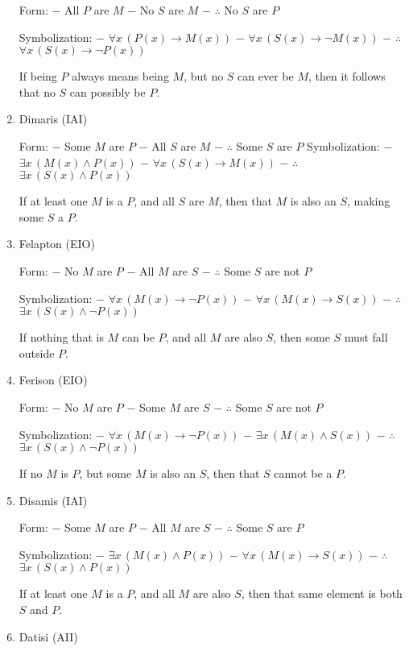 \begin{enumerate}
  Form: − All \(P\) are \(M\) − No \(S\) are \(M\) − \(\therefore\) No
  \(S\) are \(P\)

  Symbolization: − \(\forall x \, (P(x) \rightarrow M(x))\) −
  \(\forall x \, (S(x) \rightarrow \lnot M(x))\) − \(\therefore\)
  \(\forall x \, (S(x) \rightarrow \lnot P(x))\)

  If being \(P\) always means being \(M\), but no \(S\) can ever be
  \(M\), then it follows that no \(S\) can possibly be \(P\).
\item
  Dimaris (IAI)

  Form: − Some \(M\) are \(P\) − All \(S\) are \(M\) − \(\therefore\)
  Some \(S\) are \(P\) Symbolization: −
  \(\exists x \, (M(x) \land P(x))\) −
  \(\forall x \, (S(x) \rightarrow M(x))\) − \(\therefore\)
  \(\exists x \, (S(x) \land P(x))\)

  If at least one \(M\) is a \(P\), and all \(S\) are \(M\), then that
  \(M\) is also an \(S\), making some \(S\) a \(P\).
\item
  Felapton (EIO)

  Form: − No \(M\) are \(P\) − All \(M\) are \(S\) − \(\therefore\) Some
  \(S\) are not \(P\)

  Symbolization: − \(\forall x \, (M(x) \rightarrow \lnot P(x))\) −
  \(\forall x \, (M(x) \rightarrow S(x))\) − \(\therefore\)
  \(\exists x \, (S(x) \land \lnot P(x))\)

  If nothing that is \(M\) can be \(P\), and all \(M\) are also \(S\),
  then some \(S\) must fall outside \(P\).
\item
  Ferison (EIO)

  Form: − No \(M\) are \(P\) − Some \(M\) are \(S\) − \(\therefore\)
  Some \(S\) are not \(P\)

  Symbolization: − \(\forall x \, (M(x) \rightarrow \lnot P(x))\) −
  \(\exists x \, (M(x) \land S(x))\) − \(\therefore\)
  \(\exists x \, (S(x) \land \lnot P(x))\)

  If no \(M\) is \(P\), but some \(M\) is also an \(S\), then that \(S\)
  cannot be a \(P\).
\item
  Disamis (IAI)

  Form: − Some \(M\) are \(P\) − All \(M\) are \(S\) − \(\therefore\)
  Some \(S\) are \(P\)

  Symbolization: − \(\exists x \, (M(x) \land P(x))\) −
  \(\forall x \, (M(x) \rightarrow S(x))\) − \(\therefore\)
  \(\exists x \, (S(x) \land P(x))\)

  If at least one \(M\) is a \(P\), and all \(M\) are also \(S\), then
  that same element is both \(S\) and \(P\).
\item
  Datisi (AII)


\end{enumerate}
